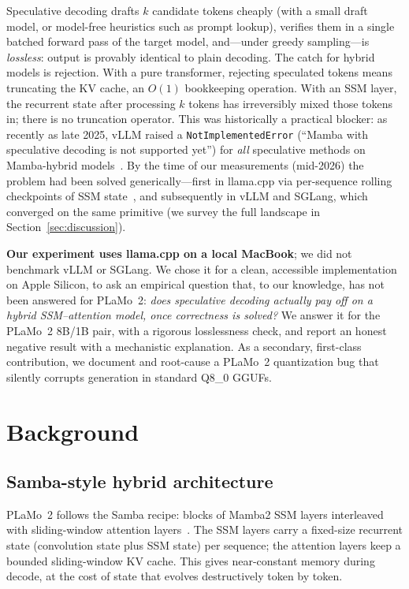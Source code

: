 \documentclass[10pt]{article}
\newcommand{\code}[1]{\texttt{#1}}
\begin{document}
Speculative decoding drafts $k$ candidate tokens cheaply (with a small draft
model, or model-free heuristics such as prompt lookup), verifies them in a
single batched forward pass of the target model, and---under greedy
sampling---is \emph{lossless}: output is provably identical to plain
decoding. The catch for hybrid models is rejection. With a pure transformer,
rejecting speculated tokens means truncating the KV cache, an $O(1)$
bookkeeping operation. With an SSM layer, the recurrent state after
processing $k$ tokens has irreversibly mixed those tokens in; there is no
truncation operator. This was historically a practical blocker: as recently
as late 2025, vLLM raised a \code{NotImplementedError} (``Mamba with
speculative decoding is not supported yet'') for \emph{all} speculative
methods on Mamba-hybrid models~\cite{vllmissue}. By the time of our
measurements (mid-2026) the problem had been solved generically---first in
llama.cpp via per-sequence rolling checkpoints of SSM
state~\cite{llamacpppr}, and subsequently in vLLM and SGLang, which converged
on the same primitive (we survey the full landscape in
Section~\ref{sec:discussion}).

\textbf{Our experiment uses llama.cpp on a local MacBook}; we did not
benchmark vLLM or SGLang. We chose it for a clean, accessible implementation
on Apple Silicon, to ask an empirical question that, to our knowledge, has
not been answered for PLaMo~2: \emph{does speculative decoding actually pay
off on a hybrid SSM--attention model, once correctness is solved?} We answer
it for the PLaMo~2 8B/1B pair, with a rigorous losslessness check, and report
an honest negative result with a mechanistic explanation. As a
secondary, first-class contribution, we document and root-cause a PLaMo~2
quantization bug that silently corrupts generation in standard Q8\_0 GGUFs.

\section{Background}

\subsection{Samba-style hybrid architecture}

PLaMo~2 follows the Samba recipe: blocks of Mamba2 SSM layers interleaved
with sliding-window attention layers~\cite{plamo2tr}. The SSM layers carry a
fixed-size recurrent state (convolution state plus SSM state) per sequence;
the attention layers keep a bounded sliding-window KV cache. This gives
near-constant memory during decode, at the cost of state that evolves
destructively token by token.
\end{document}
